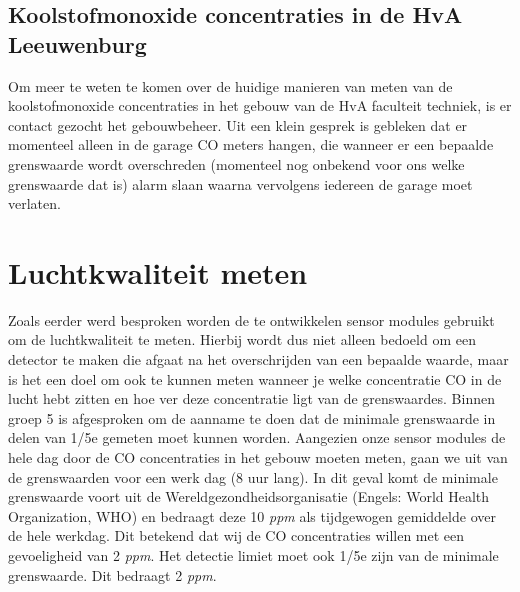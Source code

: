 \documentclass[a4paper, 11pt]{article} %
\begin{document}
\subsection{Koolstofmonoxide concentraties in de HvA Leeuwenburg}
Om meer te weten te komen over de huidige manieren van meten van de koolstofmonoxide concentraties in het gebouw van de HvA faculteit techniek, is er contact gezocht het gebouwbeheer. Uit een klein gesprek is gebleken dat er momenteel alleen in de garage CO meters hangen, die wanneer er een bepaalde grenswaarde wordt overschreden (momenteel nog onbekend voor ons welke grenswaarde dat is) alarm slaan waarna vervolgens iedereen de garage moet verlaten.

\section{Luchtkwaliteit meten}
Zoals eerder werd besproken worden de te ontwikkelen sensor modules gebruikt om de luchtkwaliteit te meten. Hierbij wordt dus niet alleen bedoeld om een detector te maken die afgaat na het overschrijden van een bepaalde waarde, maar is het een doel om ook te kunnen meten wanneer je welke concentratie CO in de lucht hebt zitten en hoe ver deze concentratie ligt van de grenswaardes. Binnen groep 5 is afgesproken om de aanname te doen dat de minimale grenswaarde in delen van 1/5e gemeten moet kunnen worden. Aangezien onze sensor modules de hele dag door de CO concentraties in het gebouw moeten meten, gaan we uit van de grenswaarden voor een werk dag (8 uur lang). In dit geval komt de minimale grenswaarde voort uit de Wereldgezondheidsorganisatie (Engels: World Health Organization, WHO) en bedraagt deze 10 \textit{ppm} als tijdgewogen gemiddelde over de hele werkdag. Dit betekend dat wij de CO concentraties willen met een gevoeligheid van 2 \textit{ppm}. Het detectie limiet moet ook 1/5e zijn van de minimale grenswaarde. Dit bedraagt 2 \textit{ppm}.
\end{document}
